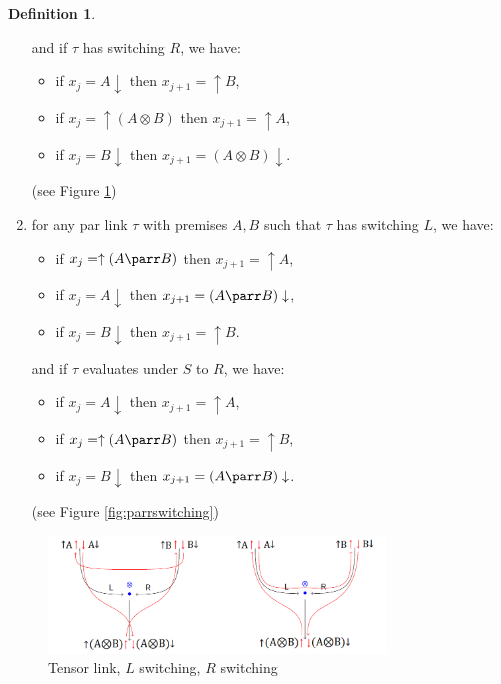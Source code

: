 \documentclass[12pt]{article}
\theoremstyle{plain}
\theoremstyle{definition}
\newtheorem{defn}[thm]{Definition} %
\begin{document}
\begin{defn}
\begin{enumerate}
\begin{itemize}
    \end{itemize}
    and if $\tau$ has switching $R$, we have:
    \begin{itemize}
        \item if $x_j = A \downarrow$ then $x_{j+1} = \uparrow B$,
        \item if $x_j = \uparrow (A \otimes B)$ then $x_{j+1} = \uparrow A$,
        \item if $x_j = B \downarrow$ then $x_{j+1} = (A \otimes B) \downarrow$.
    \end{itemize}
    (see Figure \ref{fig:tensorswitching})
    \item\label{def:trip_right_par} for any par link $\tau$ with premises $A,B$ such that $\tau$ has switching $L$, we have:
    \begin{itemize}
        \item if $x_j = \uparrow (A \parr B)$ then $x_{j+1} = \uparrow A$,
        \item if $x_j = A\downarrow$ then $x_{j+1} = (A \parr B)\downarrow$,
        \item if $x_j = B\downarrow$ then $x_{j+1} = \uparrow B$.
    \end{itemize}
    and if $\tau$ evaluates under $S$ to $R$, we have:
    \begin{itemize}
        \item if $x_j = A\downarrow$ then $x_{j+1} = \uparrow A$,
        \item if $x_j = \uparrow (A\parr B)$ then $x_{j+1} = \uparrow B$,
        \item if $x_j = B\downarrow$ then $x_{j+1} = (A\parr B)\downarrow$.
    \end{itemize}
    (see Figure \ref{fig:parrswitching})
\end{enumerate}

\end{defn}
\begin{figure}[h]
    \centering
    \includegraphics[width = 0.8\textwidth]{TensorSwitching.png}
    \caption{Tensor link, $L$ switching, $R$ switching}
    \label{fig:tensorswitching}
\end{figure}
\end{document}
